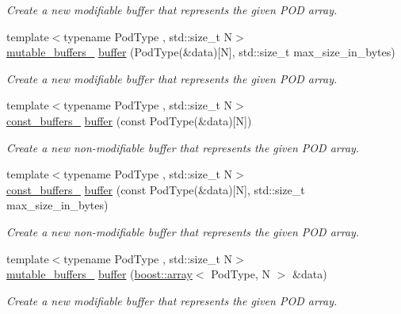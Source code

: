 \begin{DoxyCompactItemize}
\begin{DoxyCompactList}\small\item\em Create a new modifiable buffer that represents the given P\+O\+D array. \end{DoxyCompactList}\item 
{\footnotesize template$<$typename Pod\+Type , std\+::size\+\_\+t N$>$ }\\\hyperlink{classasio_1_1mutable__buffers__1}{mutable\+\_\+buffers\+\_} \hyperlink{group__buffer_ga817f0fd9a7e1eebab155ccf5b62456f0}{buffer} (Pod\+Type(\&data)\mbox{[}N\mbox{]}, std\+::size\+\_\+t max\+\_\+size\+\_\+in\+\_\+bytes)
\begin{DoxyCompactList}\small\item\em Create a new modifiable buffer that represents the given P\+O\+D array. \end{DoxyCompactList}\item 
{\footnotesize template$<$typename Pod\+Type , std\+::size\+\_\+t N$>$ }\\\hyperlink{classasio_1_1const__buffers__1}{const\+\_\+buffers\+\_} \hyperlink{group__buffer_gae73b5385bad9b7c92afce06d92c11f1e}{buffer} (const Pod\+Type(\&data)\mbox{[}N\mbox{]})
\begin{DoxyCompactList}\small\item\em Create a new non-\/modifiable buffer that represents the given P\+O\+D array. \end{DoxyCompactList}\item 
{\footnotesize template$<$typename Pod\+Type , std\+::size\+\_\+t N$>$ }\\\hyperlink{classasio_1_1const__buffers__1}{const\+\_\+buffers\+\_} \hyperlink{group__buffer_gae37e6d30503997261200b1c9a2492182}{buffer} (const Pod\+Type(\&data)\mbox{[}N\mbox{]}, std\+::size\+\_\+t max\+\_\+size\+\_\+in\+\_\+bytes)
\begin{DoxyCompactList}\small\item\em Create a new non-\/modifiable buffer that represents the given P\+O\+D array. \end{DoxyCompactList}\item 
{\footnotesize template$<$typename Pod\+Type , std\+::size\+\_\+t N$>$ }\\\hyperlink{classasio_1_1mutable__buffers__1}{mutable\+\_\+buffers\+\_} \hyperlink{group__buffer_gafec66696edfddf306d7c91aba75b1723}{buffer} (\hyperlink{classboost_1_1array}{boost\+::array}$<$ Pod\+Type, N $>$ \&data)
\begin{DoxyCompactList}\small\item\em Create a new modifiable buffer that represents the given P\+O\+D array. \end{DoxyCompactList}\item 

\end{DoxyCompactItemize}
